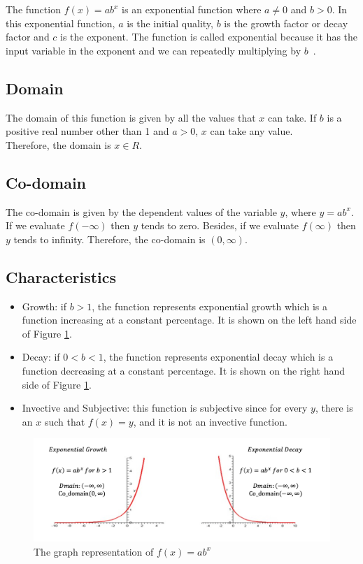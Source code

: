\documentclass[11pt]{article}
\begin{document}
The function $f(x) = ab^x$ is an exponential function where $a\neq0$ and $b>0$. In this exponential function, $a$ is the initial quality, $b$ is the growth factor or decay factor and $c$ is the exponent. The function is called exponential because it has the input variable in the exponent and we can repeatedly multiplying by $b$~\cite{browder2012mathematical}.

\subsection{Domain}
The domain of this function is given by all the values that $x$ can take. If $b$ is a positive real number other than 1 and $a> 0$, $x$ can take any value.\\
Therefore, the domain is \textbf{$x\in R$}.

\subsection{Co-domain}
The co-domain is given by the dependent values of the variable $y$, where $y = ab^x$. If we evaluate $f(-\infty)$ then $y$ tends to zero. Besides, if we evaluate $f(\infty)$ then $y$ tends to infinity\cite{Anu:2013}.
Therefore, the co-domain is $(0, \infty)$.

\subsection{Characteristics}
\begin{itemize}
    \item Growth: if $b>1$, the function represents exponential growth which is a function increasing at a constant percentage. It is shown on the left hand side of Figure \ref{fig:my_label}.
    \item Decay: if $0<b<1$, the function represents exponential decay which is a function decreasing at a constant percentage. It is shown on the right hand side of Figure \ref{fig:my_label}.
    \item Invective and Subjective: this function is subjective since for every $y$, there is an $x$ such that $f(x) = y$, and it is not an invective function.
\end{itemize}

\begin{figure}[h]
    \centering
    \includegraphics[width=12cm]{images/Function.png}
    \caption{The graph representation of $f(x) = ab^x$}
    \label{fig:my_label}
\end{figure}
\end{document}
